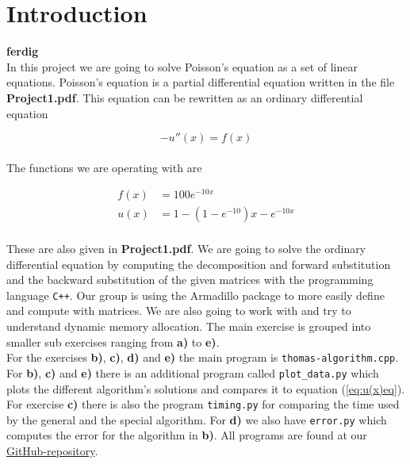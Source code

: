 \documentclass{article}
\begin{document}
\vspace{1cm}

\section{Introduction} \label{sec:Introduction}

{\large \bf ferdig} \\

In this project we are going to solve Poisson's equation as a set of linear equations. Poisson's equation is a partial differential equation written in the file \textbf{Project1.pdf}. This equation can be rewritten as an ordinary differential equation

\begin{equation}
  - u''(x) = f(x)   \label{eq:u(x)diffeq}
\end{equation} \\

The functions we are operating with are

\begin{align}
  f(x) &= 100 e ^{-10 x}    \label{eq:f(x)eq} \\
  u(x) &= 1 - (1- e ^{-10}) x - e ^{- 10 x} \label{eq:u(x)eq}
\end{align} \\

These are also given in \textbf{Project1.pdf}. We are going to solve the ordinary differential equation by computing the decomposition and forward substitution and the backward substitution of the given matrices with the programming language \texttt{C++}. Our group is using the Armadillo package to more easily define and compute with matrices. We are also going to work with and try to understand dynamic memory allocation. The main exercise is grouped into smaller sub exercises ranging from \textbf{a)} to \textbf{e)}. \\

For the exercises \textbf{b)}, \textbf{c)}, \textbf{d)} and \textbf{e)} the main program is \texttt{thomas-algorithm.cpp}. For \textbf{b)}, \textbf{c)} and \textbf{e)} there is an additional program called \texttt{plot\_data.py} which plots the different algorithm's solutions and compares it to equation (\ref{eq:u(x)eq}). For exercise \textbf{c)} there is also the program \texttt{timing.py} for comparing the time used by the general and the special algorithm. For \textbf{d)} we also have \texttt{error.py} which computes the error for the algorithm in \textbf{b)}.
All programs are found at our \href{https://github.com/Erikbgram/Fys3150}{GitHub-repository}. \\
\end{document}
